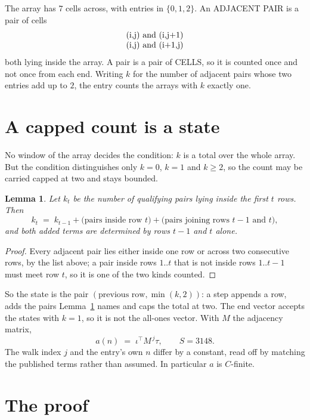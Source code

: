 \documentclass[11pt,a4paper]{article}
\theoremstyle{plain}
\newtheorem{lemma}[theorem]{Lemma}
\theoremstyle{definition}
\begin{document}
The array has $7$ cells across, with entries in $\{0,1,2\}$. An ADJACENT PAIR is a pair of cells
\[
\begin{array}{l}
$(i,j)\text{ and }(i,j{+}1)$ \\
$(i,j)\text{ and }(i{+}1,j)$ \\
\end{array}
\]
both lying inside the array. A pair is a pair of CELLS, so it is counted once and not once from
each end. Writing $k$ for the number of adjacent pairs whose two entries add up to $2$, the
entry counts the arrays with $k$ exactly one.

\section{A capped count is a state}

No window of the array decides the condition: $k$ is a total over the whole array. But the
condition distinguishes only $k=0$, $k=1$ and $k\ge2$, so the count may be carried capped at
two and stays bounded.

\begin{lemma}\label{lem:cap}
Let $k_t$ be the number of qualifying pairs lying inside the first $t$ rows. Then
\[
k_{t}\;=\;k_{t-1}+\bigl(\text{pairs inside row } t\bigr)
+\bigl(\text{pairs joining rows } t-1 \text{ and } t\bigr),
\]
and both added terms are determined by rows $t-1$ and $t$ alone.
\end{lemma}

\begin{proof}
Every adjacent pair lies either inside one row or across two consecutive rows, by the list
above; a pair inside rows $1..t$ that is not inside rows $1..t-1$ must meet row $t$, so it is
one of the two kinds counted.
\end{proof}

So the state is the pair $(\text{previous row},\min(k,2))$: a step appends a row, adds the
pairs Lemma~\ref{lem:cap} names and caps the total at two. The end vector accepts the states
with $k=1$, so it is not the all-ones vector. With $M$ the adjacency matrix,
\[
a(n)\;=\;\iota^{\!\top}M^{\,j}\tau ,\qquad S=3148.
\]
The walk index $j$ and the entry's own $n$ differ by a constant, read off by matching the
published terms rather than assumed. In particular $a$ is $C$-finite.

\section{The proof}
\end{document}
